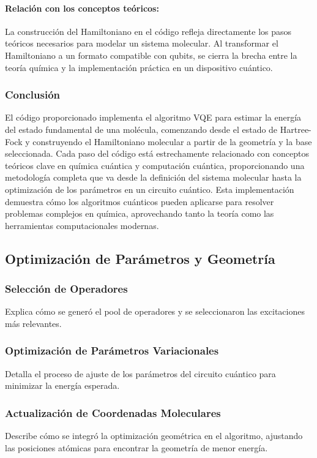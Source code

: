 \paragraph{Relación con los conceptos teóricos:}

La construcción del Hamiltoniano en el código refleja directamente los pasos teóricos necesarios para modelar un sistema molecular. Al transformar el Hamiltoniano a un formato compatible con qubits, se cierra la brecha entre la teoría química y la implementación práctica en un dispositivo cuántico.

\subsubsection{Conclusión}

El código proporcionado implementa el algoritmo VQE para estimar la energía del estado fundamental de una molécula, comenzando desde el estado de Hartree-Fock y construyendo el Hamiltoniano molecular a partir de la geometría y la base seleccionada. Cada paso del código está estrechamente relacionado con conceptos teóricos clave en química cuántica y computación cuántica, proporcionando una metodología completa que va desde la definición del sistema molecular hasta la optimización de los parámetros en un circuito cuántico. Esta implementación demuestra cómo los algoritmos cuánticos pueden aplicarse para resolver problemas complejos en química, aprovechando tanto la teoría como las herramientas computacionales modernas.
\subsection{Optimización de Parámetros y Geometría}

\subsubsection{Selección de Operadores}
Explica cómo se generó el pool de operadores y se seleccionaron las excitaciones más relevantes.

\subsubsection{Optimización de Parámetros Variacionales}
Detalla el proceso de ajuste de los parámetros del circuito cuántico para minimizar la energía esperada.

\subsubsection{Actualización de Coordenadas Moleculares}
Describe cómo se integró la optimización geométrica en el algoritmo, ajustando las posiciones atómicas para encontrar la geometría de menor energía.

